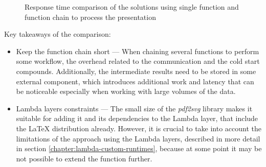 \begin{figure}[H]
    \caption{Response time comparison of the solutions using single function and function chain to process the presentation}
    \label{chart:step-function-single-function-vs-function-chain}
\end{figure}

Key takeaways of the comparison:

\begin{itemize}
   \item Keep the function chain short --- When chaining several functions to perform some workflow, the overhead related to the communication and the cold start compounds. Additionally, the intermediate results need to be stored in some external component, which introduces additional work and latency that can be noticeable especially when working with large volumes of the data.
   \item Lambda layers constraints --- The small size of the \textit{pdf2svg} library makes it suitable for adding it and its dependencies to the Lambda layer, that include the LaTeX distribution already. However, it is crucial to take into account the limitations of the approach using the Lambda layers, described in more detail in section \ref{chapter:lambda-custom-runtimes}, because at some point it may be not possible to extend the function further.
\end{itemize}

